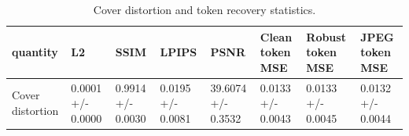 \begin{table}
\caption{Cover distortion and token recovery statistics.}
\label{tab:cover}
\begin{tabular}{llllllll}
\toprule
quantity & L2 & SSIM & LPIPS & PSNR & Clean token MSE & Robust token MSE & JPEG token MSE \\
\midrule
Cover distortion & 0.0001 +/- 0.0000 & 0.9914 +/- 0.0030 & 0.0195 +/- 0.0081 & 39.6074 +/- 0.3532 & 0.0133 +/- 0.0043 & 0.0133 +/- 0.0045 & 0.0132 +/- 0.0044 \\
\bottomrule
\end{tabular}
\end{table}

